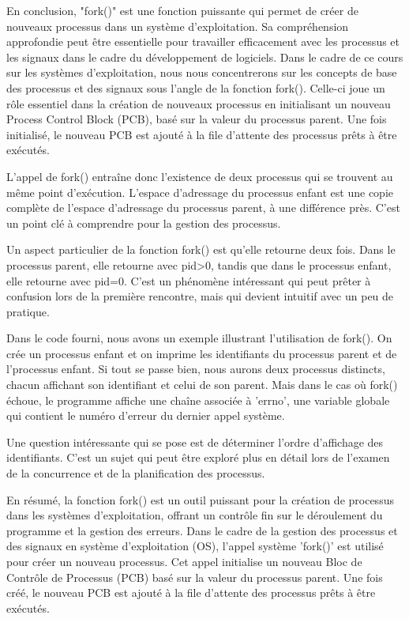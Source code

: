 \documentclass[12pt]{article}
\begin{document}
En conclusion, "fork()" est une fonction puissante qui permet de créer de nouveaux processus dans un système d'exploitation. Sa compréhension approfondie peut être essentielle pour travailler efficacement avec les processus et les signaux dans le cadre du développement de logiciels.
Dans le cadre de ce cours sur les systèmes d'exploitation, nous nous concentrerons sur les concepts de base des processus et des signaux sous l'angle de la fonction fork(). Celle-ci joue un rôle essentiel dans la création de nouveaux processus en initialisant un nouveau Process Control Block (PCB), basé sur la valeur du processus parent. Une fois initialisé, le nouveau PCB est ajouté à la file d'attente des processus prêts à être exécutés.

L'appel de fork() entraîne donc l'existence de deux processus qui se trouvent au même point d'exécution. L'espace d'adressage du processus enfant est une copie complète de l'espace d'adressage du processus parent, à une différence près. C'est un point clé à comprendre pour la gestion des processus.

Un aspect particulier de la fonction fork() est qu'elle retourne deux fois. Dans le processus parent, elle retourne avec pid>0, tandis que dans le processus enfant, elle retourne avec pid=0. C'est un phénomène intéressant qui peut prêter à confusion lors de la première rencontre, mais qui devient intuitif avec un peu de pratique.

Dans le code fourni, nous avons un exemple illustrant l'utilisation de fork(). On crée un processus enfant et on imprime les identifiants du processus parent et de l'processus enfant. Si tout se passe bien, nous aurons deux processus distincts, chacun affichant son identifiant et celui de son parent. Mais dans le cas où fork() échoue, le programme affiche une chaîne associée à 'errno', une variable globale qui contient le numéro d'erreur du dernier appel système.

Une question intéressante qui se pose est de déterminer l'ordre d'affichage des identifiants. C'est un sujet qui peut être exploré plus en détail lors de l'examen de la concurrence et de la planification des processus.

En résumé, la fonction fork() est un outil puissant pour la création de processus dans les systèmes d'exploitation, offrant un contrôle fin sur le déroulement du programme et la gestion des erreurs.
Dans le cadre de la gestion des processus et des signaux en système d'exploitation (OS), l'appel système 'fork()' est utilisé pour créer un nouveau processus. Cet appel initialise un nouveau Bloc de Contrôle de Processus (PCB) basé sur la valeur du processus parent. Une fois créé, le nouveau PCB est ajouté à la file d'attente des processus prêts à être exécutés. 
\end{document}
